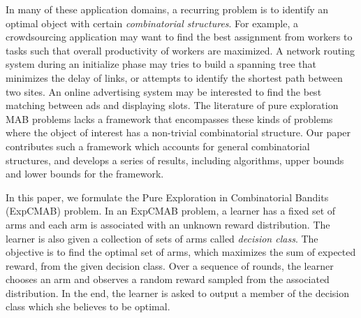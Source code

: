 \documentclass{article}
\newcommand{\Problem}{{\small \textsf{ExpCMAB}}\xspace}
\begin{document}
In many  of these application domains, a recurring problem is to identify an optimal object with certain \emph{combinatorial structures}. 
For example, a crowdsourcing application may want to find the best assignment from workers to tasks such that overall productivity of workers are maximized. 
A network routing system during an initialize phase may tries to build a spanning tree that minimizes the delay of links, or attempts to identify the shortest path between two sites.  
An online advertising system may be interested to find the best matching between ads and displaying slots. 
The literature of pure exploration MAB problems lacks a framework that encompasses these kinds of problems where the object of interest has a non-trivial combinatorial structure.  
Our paper contributes such a framework which accounts for general combinatorial structures, and develops a series of results, including algorithms, upper bounds and lower bounds for the framework.

In this paper, we formulate the Pure Exploration in Combinatorial Bandits (\Problem) problem.  
In an \Problem problem, a learner has a fixed set of arms and each arm is associated with an unknown reward distribution. 
The learner is also given a collection of sets of arms called \emph{decision class}. 
The objective is to find the optimal set of arms, which maximizes the sum of expected reward, from the given decision class. 
Over a sequence of rounds, the learner chooses an arm and observes a random reward sampled from the associated distribution. 
In the end, the learner is asked to output a member of the decision class which she believes to be optimal.
\end{document}
